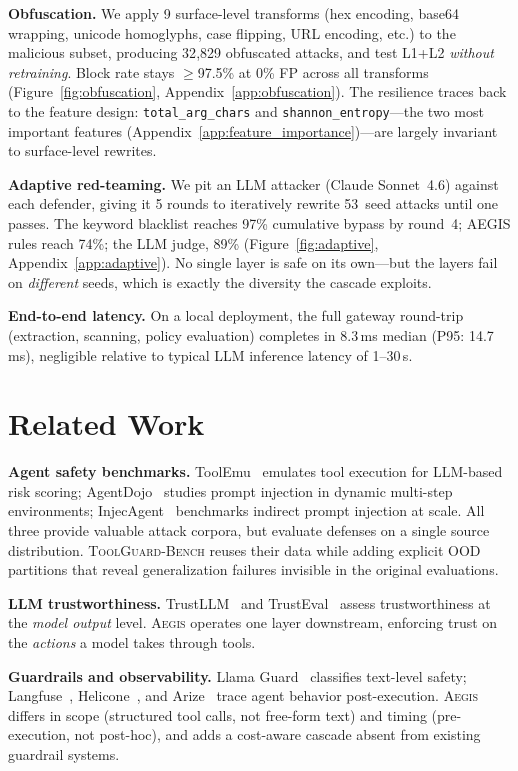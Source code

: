 \documentclass{article}
\newcommand{\system}{\textsc{Aegis}\xspace}
\newcommand{\bench}{\textsc{ToolGuard-Bench}\xspace}
\begin{document}
\textbf{Obfuscation.}
We apply 9 surface-level transforms (hex encoding, base64 wrapping, unicode homoglyphs, case flipping, URL encoding, etc.) to the malicious subset, producing 32{,}829 obfuscated attacks, and test L1+L2 \emph{without retraining}.
Block rate stays $\ge$97.5\% at 0\% FP across all transforms (Figure~\ref{fig:obfuscation}, Appendix~\ref{app:obfuscation}).
The resilience traces back to the feature design: \texttt{total\_arg\_chars} and \texttt{shannon\_entropy}---the two most important features (Appendix~\ref{app:feature_importance})---are largely invariant to surface-level rewrites.

\textbf{Adaptive red-teaming.}
We pit an LLM attacker (Claude Sonnet~4.6) against each defender, giving it 5 rounds to iteratively rewrite 53~seed attacks until one passes.
The keyword blacklist reaches 97\% cumulative bypass by round~4; AEGIS rules reach 74\%; the LLM judge, 89\% (Figure~\ref{fig:adaptive}, Appendix~\ref{app:adaptive}).
No single layer is safe on its own---but the layers fail on \emph{different} seeds, which is exactly the diversity the cascade exploits.

\textbf{End-to-end latency.}
On a local deployment, the full gateway round-trip (extraction, scanning, policy evaluation) completes in 8.3\,ms median (P95: 14.7\,ms), negligible relative to typical LLM inference latency of 1--30\,s.

\section{Related Work}
\label{sec:related}

\textbf{Agent safety benchmarks.}
ToolEmu~\citep{ruan2024toolemu} emulates tool execution for LLM-based risk scoring; AgentDojo~\citep{debenedetti2024agentsec} studies prompt injection in dynamic multi-step environments; InjecAgent~\citep{zhan2024injecagent} benchmarks indirect prompt injection at scale.
All three provide valuable attack corpora, but evaluate defenses on a single source distribution.
\bench reuses their data while adding explicit OOD partitions that reveal generalization failures invisible in the original evaluations.

\textbf{LLM trustworthiness.}
TrustLLM~\citep{huang2024position} and TrustEval~\citep{wang2024trusteval} assess trustworthiness at the \emph{model output} level.
\system operates one layer downstream, enforcing trust on the \emph{actions} a model takes through tools.

\textbf{Guardrails and observability.}
Llama Guard~\citep{inan2023llama} classifies text-level safety; Langfuse~\citep{langfuse2024}, Helicone~\citep{helicone2024}, and Arize~\citep{arize2024} trace agent behavior post-execution.
\system differs in scope (structured tool calls, not free-form text) and timing (pre-execution, not post-hoc), and adds a cost-aware cascade absent from existing guardrail systems.
\end{document}
